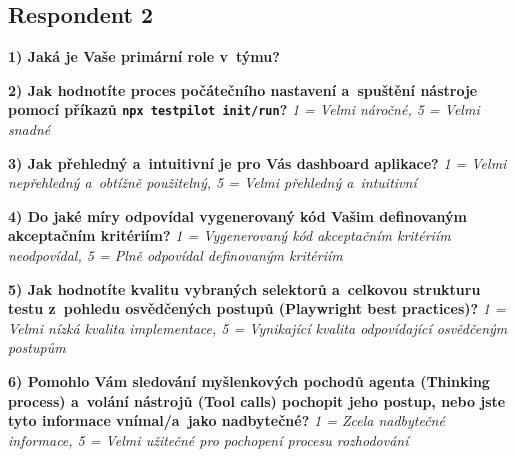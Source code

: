\documentclass[czech, ing, kiv, he, iso690numb, viewonly]{fasthesis}
\begin{document}
\subsection*{Respondent 2}
\begin{tcolorbox}[breakable, colback=gray!3, colframe=black!35, boxrule=0.4pt, arc=2pt, title={Google Forms - export odpovědi}]

\textbf{1) Jaká je Vaše primární role v~týmu?}

 \quad {} \quad {} 

\quad {} \quad {}

\textbf{2) Jak hodnotíte proces počátečního nastavení a~spuštění nástroje pomocí příkazů \texttt{npx testpilot init/run}?}
\textit{1 = Velmi náročné, 5 = Velmi snadné}

 \quad {} \quad {} \quad {} \quad {}

\textbf{3) Jak přehledný a~intuitivní je pro Vás dashboard aplikace?}
\textit{1 = Velmi nepřehledný a~obtížně použitelný, 5 = Velmi přehledný a~intuitivní}

 \quad {} \quad {} \quad {} \quad {}

\textbf{4) Do jaké míry odpovídal vygenerovaný kód Vašim definovaným akceptačním kritériím?}
\textit{1 = Vygenerovaný kód akceptačním kritériím neodpovídal, 5 = Plně odpovídal definovaným kritériím}

 \quad {} \quad {} \quad {} \quad {}

\textbf{5) Jak hodnotíte kvalitu vybraných selektorů a~celkovou strukturu testu z~pohledu osvědčených postupů (Playwright best practices)?}
\textit{1 = Velmi nízká kvalita implementace, 5 = Vynikající kvalita odpovídající osvědčeným postupům}

 \quad {} \quad {} \quad {} \quad {}

\textbf{6) Pomohlo Vám sledování myšlenkových pochodů agenta (Thinking process) a~volání nástrojů (Tool calls) pochopit jeho postup, nebo jste tyto informace vnímal/a~jako nadbytečné?}
\textit{1 = Zcela nadbytečné informace, 5 = Velmi užitečné pro pochopení procesu rozhodování}

 \quad {} \quad {} \quad {} \quad {}


\end{tcolorbox}
\end{document}
